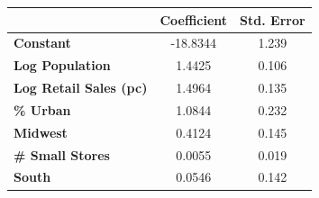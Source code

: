 \begin{center}
\begin{tabular}{lcc}
                                & \textbf{Coefficient} & \textbf{Std. Error}\\
\midrule
\textbf{Constant}                  &     -18.8344  &        1.239    \\
\textbf{Log Population}               &       1.4425  &        0.106 \\
\textbf{Log Retail Sales (pc)} &       1.4964  &        0.135    \\
\textbf{\% Urban}             &       1.0844  &        0.232    \\
\textbf{Midwest}                &       0.4124  &        0.145  \\
\textbf{\# Small Stores}       &       0.0055  &        0.019   \\
\textbf{South}                  &       0.0546  &        0.142  \\
\bottomrule
\end{tabular}
\end{center}

